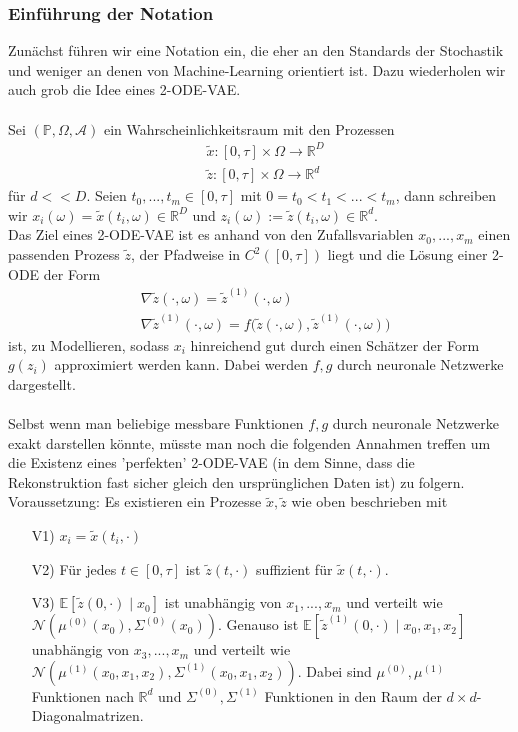 \documentclass[12pt]{article}
\newcommand{\E}{\mathbb{E}}
\newcommand{\R}{\mathbb{R}}
\newcommand{\tx}{\widetilde{x}}
\newcommand{\tz}{\widetilde{z}}
\newcommand{\bP}{\mathbb{P}}
\begin{document}
	\newpage
	\subsubsection[Notation]{Einführung der Notation}
	Zunächst führen wir eine Notation ein, die eher an den Standards der Stochastik und weniger an denen von Machine-Learning orientiert ist. Dazu wiederholen wir auch grob die Idee eines 2-ODE-VAE.\\
	\\
	Sei $(\bP,\Omega,\mathcal{A})$ ein Wahrscheinlichkeitsraum mit den Prozessen
	\begin{align*}
	& \tx : [0,\tau] \times \Omega \rightarrow \R^D\\
	& \tz : [0,\tau] \times \Omega \rightarrow \R^d
	\end{align*}
	für $d << D$. Seien $t_0,...,t_m \in [0,\tau]$ mit $0=t_0<t_1<...<t_m$, dann schreiben wir $x_i(\omega) = \tx(t_i,\omega) \in \R^D$ und $z_i(\omega) := \tz(t_i, \omega) \in \R^d$.\\
	Das Ziel eines 2-ODE-VAE ist es anhand von den Zufallsvariablen $x_0,...,x_m$ einen passenden Prozess $\tz$, der Pfadweise in $C^2([0,\tau])$ liegt und die Lösung einer 2-ODE der Form
	\begin{align*}
	& \nabla \tz(\cdot,\omega) = \tz^{(1)}(\cdot,\omega)\\
	& \nabla \tz^{(1)}(\cdot,\omega) = f\big( \tz(\cdot,\omega), \tz^{(1)}(\cdot,\omega) \big)
	\end{align*}
	ist, zu Modellieren, sodass $x_i$ hinreichend gut durch einen Schätzer der Form $g(z_i)$ approximiert werden kann. Dabei werden $f,g$ durch neuronale Netzwerke dargestellt.\\
	\\
	Selbst wenn man beliebige messbare Funktionen $f,g$ durch neuronale Netzwerke exakt darstellen könnte, müsste man noch die folgenden Annahmen treffen um die Existenz eines 'perfekten' 2-ODE-VAE (in dem Sinne, dass die Rekonstruktion fast sicher gleich den ursprünglichen Daten ist) zu folgern.\\
	Voraussetzung: Es existieren ein Prozesse $\tx,\tz$ wie oben beschrieben mit
	\begin{itemize}
		\item[V1)] $x_i = \tx(t_i,\cdot)$

		\item[V2)] Für jedes $t \in [0,\tau]$ ist $\tz(t,\cdot)$ suffizient für $\tx(t,\cdot)$.

		\item[V3)] $\E[\tz(0,\cdot) \mid x_0]$ ist unabhängig von $x_1,...,x_m$ und verteilt wie $\mathcal{N}(\mu^{(0)}(x_0),\Sigma^{(0)}(x_0))$. Genauso ist $\E[\tz^{(1)}(0,\cdot) \mid x_0,x_1,x_2]$ unabhängig von $x_3,...,x_m$ und verteilt wie $\mathcal{N}(\mu^{(1)}(x_0,x_1,x_2),\Sigma^{(1)}(x_0,x_1,x_2))$. Dabei sind $\mu^{(0)},\mu^{(1)}$ Funktionen nach $\R^d$ und $\Sigma^{(0)},\Sigma^{(1)}$ Funktionen in den Raum der $d \times d$-Diagonalmatrizen.
	\end{itemize}
\end{document}
